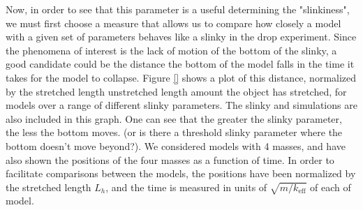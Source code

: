 \documentclass[prb,preprint,superscriptaddress]{revtex4-1}
\begin{document}
Now, in order to see that this parameter is a useful determining the "slinkiness", we must first choose a measure that allows us to compare how closely a model
with a given set of parameters behaves like a slinky in the drop experiment.  Since the phenomena of interest is the lack of motion of the bottom of the slinky, 
a good candidate could be the distance the bottom of the model falls in the time it takes for the model to collapse.  Figure \ref{} shows a plot of this distance, normalized by the stretched length unstretched length amount the object has stretched, for models over a range of different slinky parameters.  The slinky and simulations are also included in this graph.  One can see that the greater the slinky parameter, the less the bottom moves.  (or is there a threshold slinky parameter where  the bottom doesn't move beyond?).  We considered models with 4 masses, and have also shown the positions of the four masses as a function of time.  In order to facilitate comparisons between the models, the positions have been normalized by the stretched length $L_h$, and the time is measured in units of $\sqrt{m/k_{\text{eff}}}$ of each of model.  

\end{document}
